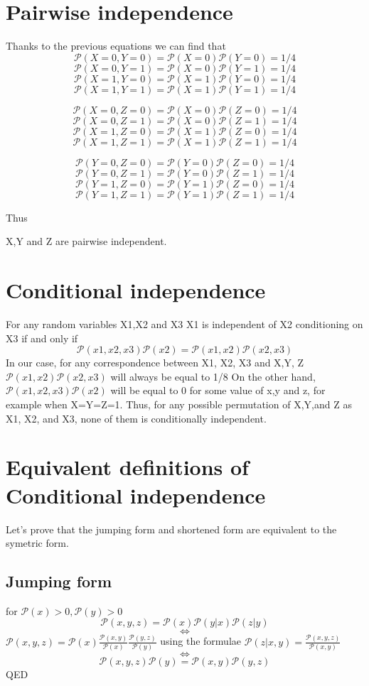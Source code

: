 \documentclass[10pt]{article}
\begin{document}
\section{Pairwise independence}
Thanks to the previous equations we can find that
\[\mathcal{P}(X=0,Y=0)=\mathcal{P}(X=0)\mathcal{P}(Y=0)=1/4\]
\[\mathcal{P}(X=0,Y=1)=\mathcal{P}(X=0)\mathcal{P}(Y=1)=1/4\]
\[\mathcal{P}(X=1,Y=0)=\mathcal{P}(X=1)\mathcal{P}(Y=0)=1/4\]
\[\mathcal{P}(X=1,Y=1)=\mathcal{P}(X=1)\mathcal{P}(Y=1)=1/4\]

\[\mathcal{P}(X=0,Z=0)=\mathcal{P}(X=0)\mathcal{P}(Z=0)=1/4\]
\[\mathcal{P}(X=0,Z=1)=\mathcal{P}(X=0)\mathcal{P}(Z=1)=1/4\]
\[\mathcal{P}(X=1,Z=0)=\mathcal{P}(X=1)\mathcal{P}(Z=0)=1/4\]
\[\mathcal{P}(X=1,Z=1)=\mathcal{P}(X=1)\mathcal{P}(Z=1)=1/4\]

\[\mathcal{P}(Y=0,Z=0)=\mathcal{P}(Y=0)\mathcal{P}(Z=0)=1/4\]
\[\mathcal{P}(Y=0,Z=1)=\mathcal{P}(Y=0)\mathcal{P}(Z=1)=1/4\]
\[\mathcal{P}(Y=1,Z=0)=\mathcal{P}(Y=1)\mathcal{P}(Z=0)=1/4\]
\[\mathcal{P}(Y=1,Z=1)=\mathcal{P}(Y=1)\mathcal{P}(Z=1)=1/4\]

Thus

X,Y and Z are pairwise independent.
\section{Conditional independence}
For any random variables X1,X2 and X3
X1 is independent of X2 conditioning on X3 if and only if
\[\mathcal{P}(x1,x2,x3)\mathcal{P}(x2)=\mathcal{P}(x1,x2)\mathcal{P}(x2,x3)\]
In our case, for any correspondence between X1, X2, X3 and X,Y, Z $\mathcal{P}(x1,x2)\mathcal{P}(x2,x3)$ will always be equal to 1/8
On the other hand, $\mathcal{P}(x1,x2,x3)\mathcal{P}(x2)$ will be equal to 0 for some value of x,y and z, for example when X=Y=Z=1.
Thus, for any possible permutation of X,Y,and Z as X1, X2, and X3, none of them is conditionally independent.

\section{Equivalent definitions of Conditional independence}
Let's prove that the jumping form and shortened form are equivalent to the symetric form.

\subsection{Jumping form}
for $\mathcal{P}(x)>0, \mathcal{P}(y)>0$
\[\mathcal{P}(x,y,z)=\mathcal{P}(x)\mathcal{P}(y|x)\mathcal{P}(z|y)\]
\[\Leftrightarrow\]
$\mathcal{P}(x,y,z)=\mathcal{P}(x)\frac{\mathcal{P}(x,y)}{\mathcal{P}(x)}\frac{\mathcal{P}(y,z)}{\mathcal{P}(y)}$ using the formulae $\mathcal{P}(z|x,y) = \frac{\mathcal{P}(x,y,z)}{\mathcal{P}(x,y)}$
\[\Leftrightarrow\]
\[\mathcal{P}(x,y,z)\mathcal{P}(y)=\mathcal{P}(x,y)\mathcal{P}(y,z)
\]
QED
\\
\end{document}
